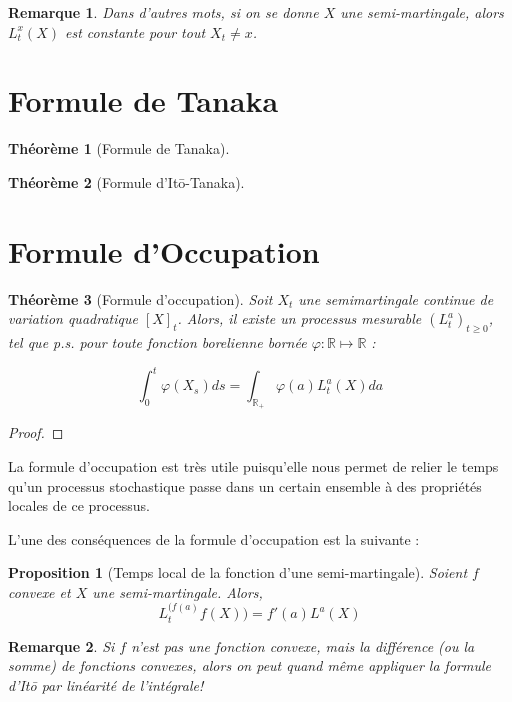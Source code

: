 \documentclass[openany]{book}
\newcommand{\R}{\mathbb{R}}
\theoremstyle{thmfont}
\newtheorem{theorem}{Théorème}[chapter]
\theoremstyle{deffont}
\theoremstyle{thmfont}
\newtheorem{prop}[prop]{Proposition}
\theoremstyle{deffont}
\newtheorem*{remark}{Remarque}
\begin{document}
\begin{remark}
  Dans d'autres mots, si on se donne $X$ une semi-martingale, alors  $L_t^x(X)$ est constante pour tout $X_t \neq x$.
\end{remark}

\section{Formule de Tanaka}

{\color{red}
  \begin{theorem}[Formule de Tanaka]
  \end{theorem}
    
  \begin{theorem}[Formule d'Itō-Tanaka]
  \end{theorem}
}
\section{Formule d'Occupation}

\begin{theorem}[Formule d'occupation]
\label{thm:occupation}
Soit $X_t$ une semimartingale continue de variation quadratique $[X]_t$. Alors, il existe un processus mesurable $(L_t^a)_{t\geq0}$, tel que p.s. pour toute fonction borelienne bornée $\varphi : \R \mapsto \R$ :

\begin{equation}
  \int_0^t \varphi(X_s) ds = \int_{\R_+}\varphi(a)L_t^a(X)da
\end{equation}

\end{theorem}

{\color{red}\begin{proof}
  \end{proof}}

La formule d'occupation est très utile puisqu'elle nous permet de relier le temps qu’un processus stochastique passe dans un certain ensemble à des propriétés locales de ce processus.

L'une des conséquences de la formule d'occupation est la suivante :

\begin{prop}[Temps local de la fonction d'une semi-martingale]
  Soient $f$ convexe et $X$ une semi-martingale. Alors,
  $$L_t^{(f(a)}f(X)) = f'(a) L^a(X)$$
\end{prop}

\begin{remark}
  Si $f$ n'est pas une fonction convexe, mais la différence (ou la somme) de fonctions convexes, alors on peut quand même appliquer la formule d'Itō par linéarité de l'intégrale!
\end{remark}
\end{document}
